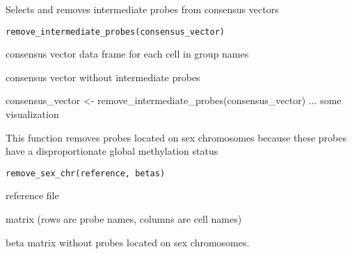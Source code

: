 \documentclass[a4paper]{book}
\begin{document}
%
\begin{Description}\relax
Selects and removes intermediate probes from consensus vectors
\end{Description}
%
\begin{Usage}
\begin{verbatim}
remove_intermediate_probes(consensus_vector)
\end{verbatim}
\end{Usage}
%
\begin{Arguments}
\begin{ldescription}
\item[\code{consensus\_vector}] consensus vector data frame for each cell in group 
names
\end{ldescription}
\end{Arguments}
%
\begin{Value}
consensus vector without intermediate probes
\end{Value}
%
\begin{Examples}
\begin{ExampleCode}
consensus_vector <- remove_intermediate_probes(consensus_vector)
... some visualization 
\end{ExampleCode}
\end{Examples}
%
\begin{Description}\relax
This function removes probes located on sex chromosomes because these 
probes have a disproportionate global methylation status
\end{Description}
%
\begin{Usage}
\begin{verbatim}
remove_sex_chr(reference, betas)
\end{verbatim}
\end{Usage}
%
\begin{Arguments}
\begin{ldescription}
\item[\code{reference}] reference file

\item[\code{betas}] matrix (rows are probe names, columns are cell names)
\end{ldescription}
\end{Arguments}
%
\begin{Value}
beta matrix without probes located on sex chromosomes.
\end{Value}
\end{document}
